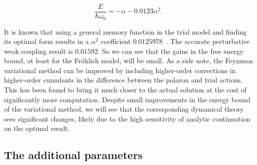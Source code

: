 \begin{equation} \label{eqn:weakcoupling}
    \frac{E}{\hbar\omega_0} = -\alpha - 0.0123 \alpha^2.
\end{equation}

It is known that using a general memory function in the trial model and finding its optimal form results in a $\alpha^2$ coefficient $0.0125978$~\cite{rosenfelder_best_2001}. The accurate perturbative weak coupling result is $0.01592$. So we can see that the gains in the free energy bound, at least for the Fr\"ohlich model, will be small. As a side note, the Feynman variational method can be improved by including higher-order corrections in higher-order cumulants in the difference between the polaron and trial actions. This has been found to bring it much closer to the actual solution at the cost of significantly more computation. Despite small improvements in the energy bound of the variational method, we will see that the corresponding dynamical theory sees significant changes, likely due to the high sensitivity of analytic continuation on the optimal result.

\subsection{The additional parameters}

